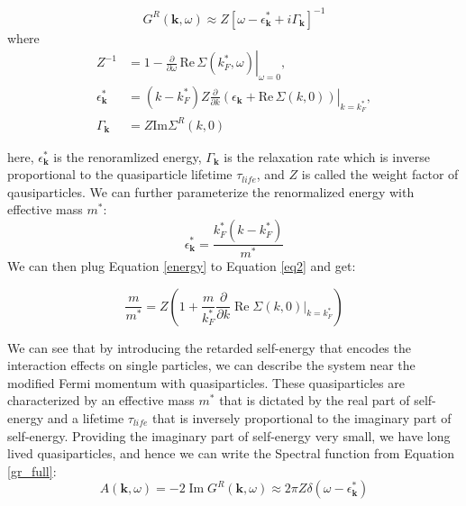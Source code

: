 \begin{equation}
\label{gr_full}
G^{R}(\mathbf{k}, \omega) \approx Z \left[ \omega - \epsilon^*_{\mathbf{k}} + i \Gamma_{\mathbf{k}} \right]^{-1}
\end{equation}
where
\begin{align} 
	Z^{-1} &= 1 - \left. \frac{\partial}{\partial \omega} \, \mathrm{Re} \, \Sigma (k^*_{F}, \omega) \right|_{\omega = 0}, 
	\\ 
	\label{eq2}
	\epsilon^*_{\mathbf{k}} &= (k - k^*_{F}) Z \left. \frac{\partial}{\partial k} \left( \epsilon_{\mathbf{k}} + \mathrm{Re} \, \Sigma ({k}, 0) \right) \right|_{k = k^*_{F}}, \\ 
	\label{gamma}
	\Gamma_{\mathbf{k}} &= Z \mathrm{Im} \Sigma^{R}({k}, 0) 
\end{align}

\noindent here, $\epsilon^*_{\mathbf{k}}$ is the renoramlized energy, $\Gamma_{\mathbf{k}}$ is the relaxation rate which is inverse proportional to the quasiparticle lifetime $\tau_{life}$, and $Z$ is called the weight factor of qausiparticles. We can further parameterize the renormalized energy with effective mass $m^*$: 
\begin{equation}\label{energy}
	\epsilon^*_{\mathbf{k}} = \frac{k^*_F(k-k^*_F)}{m^*}
\end{equation}
We can then plug Equation \ref{energy} to Equation \ref{eq2} and get: 

\begin{equation}
	\frac{m}{m^*} = Z(1 + \frac{m}{k^*_F}\frac{\partial}{\partial k}\operatorname{Re}\Sigma(k,0)|_{k = k^*_{F}})
\end{equation}

We can see that by introducing the retarded self-energy that encodes the interaction effects on single particles, we can describe the system near the modified Fermi momentum with quasiparticles. These quasiparticles are characterized by an effective mass $m^*$ that is dictated by the real part of self-energy and a lifetime $\tau_{life}$ that is inversely proportional to the imaginary part of self-energy. Providing the imaginary part of self-energy very small, we have long lived quasiparticles, and hence we can write the Spectral function from Equation \ref{gr_full}:
\begin{equation}
	\label{eq.akw}
	A(\textbf{k},\omega) = -2\operatorname{Im}G^R(\textbf{k}, \omega) 
	\approx 2\pi Z\delta(\omega-\epsilon^*_\textbf{k}) 
\end{equation}

